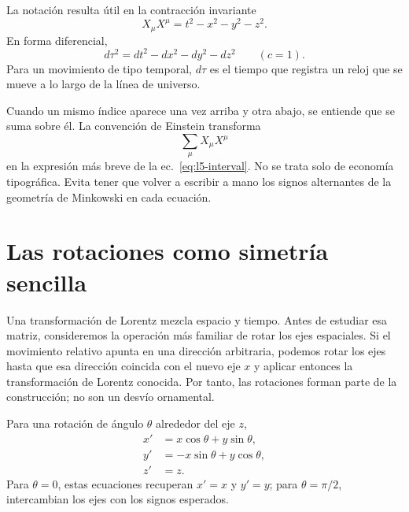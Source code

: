 La notación resulta útil en la contracción invariante
\begin{equation}
X_\mu X^\mu=t^2-x^2-y^2-z^2.
\label{eq:l5-interval}
\end{equation}
En forma diferencial,
\begin{equation}
d\tau^2=dt^2-dx^2-dy^2-dz^2
\qquad (c=1).
\label{eq:l5-proper-time}
\end{equation}
Para un movimiento de tipo temporal, \(d\tau\) es el tiempo que registra un reloj que se mueve a lo largo de la línea de universo.

Cuando un mismo índice aparece una vez arriba y otra abajo, se entiende que se suma sobre él. La convención de Einstein transforma
\begin{equation}
\sum_{\mu}X_\mu X^\mu
\end{equation}
en la expresión más breve de la ec.~\eqref{eq:l5-interval}. No se trata solo de economía tipográfica. Evita tener que volver a escribir a mano los signos alternantes de la geometría de Minkowski en cada ecuación.

\begin{classroomqa}\end{classroomqa}

\section{Las rotaciones como simetría sencilla}

Una transformación de Lorentz mezcla espacio y tiempo. Antes de estudiar esa matriz, consideremos la operación más familiar de rotar los ejes espaciales. Si el movimiento relativo apunta en una dirección arbitraria, podemos rotar los ejes hasta que esa dirección coincida con el nuevo eje \(x\) y aplicar entonces la transformación de Lorentz conocida. Por tanto, las rotaciones forman parte de la construcción; no son un desvío ornamental.

Para una rotación de ángulo \(\theta\) alrededor del eje \(z\),
\begin{align}
x'&=x\cos\theta+y\sin\theta,\nonumber\\
y'&=-x\sin\theta+y\cos\theta,\label{eq:l5-rotation}\\
z'&=z.\nonumber
\end{align}
Para \(\theta=0\), estas ecuaciones recuperan \(x'=x\) y \(y'=y\); para \(\theta=\pi/2\), intercambian los ejes con los signos esperados.


